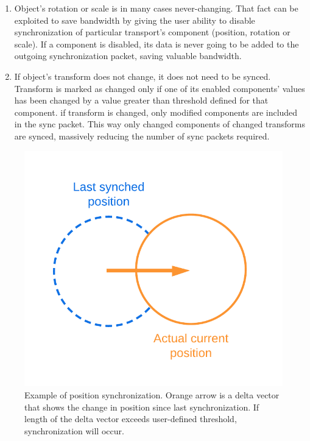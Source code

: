 \documentclass[times, utf8, diplomski]{fer}
\begin{document}
\begin{enumerate}
	\item Object's rotation or scale is in many cases never-changing. That fact can be exploited to save bandwidth by giving the user ability to disable synchronization of particular transport's component (position, rotation or scale). If a component is disabled, its data is never going to be added to the outgoing synchronization packet, saving valuable bandwidth.
	
	\item If object's transform does not change, it does not need to be synced. Transform is marked as changed only if one of its enabled components' values has been changed by a value greater than threshold defined for that component. if transform is changed, only modified components are included in the sync packet. This way only changed components of changed transforms are synced, massively reducing the number of sync packets required.
\end{enumerate}

\begin{figure}[H]
	\centering
	\includegraphics[scale=0.3]{NetworkTransform-position-diagram}
	\caption{Example of position synchronization. Orange arrow is a delta vector that shows the change in position since last synchronization. If length of the delta vector exceeds user-defined threshold, synchronization will occur.}
\end{figure}
\end{document}
